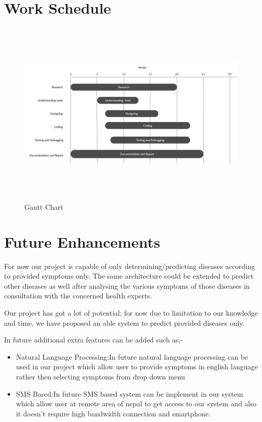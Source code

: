 {\section{Work Schedule}
\begin{figure}[H]
\includegraphics[width=150mm,height=90mm]{images/ganttchartnew.jpg}
 \caption{Gantt Chart}
\end{figure}

\section{Future Enhancements}

For now our project is capable of only determining/predicting diseases according to provided
symptoms only. The same architecture could be extended to predict other diseases as well
after analysing the various symptoms of those diseases in consultation with the concerned 
health experts. 

Our project has got a lot of potential; for now due to limitation to our knowledge and time, we have proposed an able system to predict provided diseases only.

In future additional extra features can be added such as;- 
\begin{itemize}
    \item Natural Language Processing:In future natural language processing can be used in our project which allow user to provide symptoms in english language rather then selecting symptoms from drop down menu
    \item SMS Based:In future SMS based system can be implement in our system which allow user at remote area of nepal to get access to our system and also it doesn't require high bandwidth connection and smartphone.
   

\end{itemize}}
